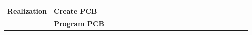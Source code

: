 \begin{table}[ht]
\begin{tabular}{ll|llllllllllllllllllll|}
    \multicolumn{1}{|l|}{\cellcolor[HTML]{38FFF8}\textbf{Realization}}     & \cellcolor[HTML]{38FFF8}\textbf{Create PCB}                                                                          & \multicolumn{1}{l|}{}                                   & \multicolumn{1}{l|}{}                                   & \multicolumn{1}{l|}{}                                   & \multicolumn{1}{l|}{}                                   & \multicolumn{1}{l|}{}                                   & \multicolumn{1}{l|}{}                                   & \multicolumn{1}{l|}{}                                   & \multicolumn{1}{l|}{}                                   & \multicolumn{1}{l|}{}                                   & \multicolumn{1}{l|}{}                                    & \multicolumn{1}{l|}{}                                    & \multicolumn{1}{l|}{}                                    & \multicolumn{1}{l|}{\cellcolor[HTML]{F8A102}}            & \multicolumn{1}{l|}{\cellcolor[HTML]{F8A102}}            & \multicolumn{1}{l|}{}                                    & \multicolumn{1}{l|}{}                                    & \multicolumn{1}{l|}{}                                    & \multicolumn{1}{l|}{}                                    & \multicolumn{1}{l|}{}                                    &             \\ \hline
    \multicolumn{1}{|l|}{\cellcolor[HTML]{38FFF8}\textbf{}}                & \cellcolor[HTML]{38FFF8}\textbf{Program PCB}                                                                         & \multicolumn{1}{l|}{}                                   & \multicolumn{1}{l|}{}                                   & \multicolumn{1}{l|}{}                                   & \multicolumn{1}{l|}{}                                   & \multicolumn{1}{l|}{}                                   & \multicolumn{1}{l|}{}                                   & \multicolumn{1}{l|}{}                                   & \multicolumn{1}{l|}{}                                   & \multicolumn{1}{l|}{}                                   & \multicolumn{1}{l|}{}                                    & \multicolumn{1}{l|}{}                                    & \multicolumn{1}{l|}{}                                    & \multicolumn{1}{l|}{\cellcolor[HTML]{F8A102}}            & \multicolumn{1}{l|}{\cellcolor[HTML]{F8A102}}            & \multicolumn{1}{l|}{\cellcolor[HTML]{F8A102}}            & \multicolumn{1}{l|}{\cellcolor[HTML]{F8A102}}            & \multicolumn{1}{l|}{}                                    & \multicolumn{1}{l|}{}                                    & \multicolumn{1}{l|}{}                                    &             \\ \hline

\end{tabular}
\end{table}
